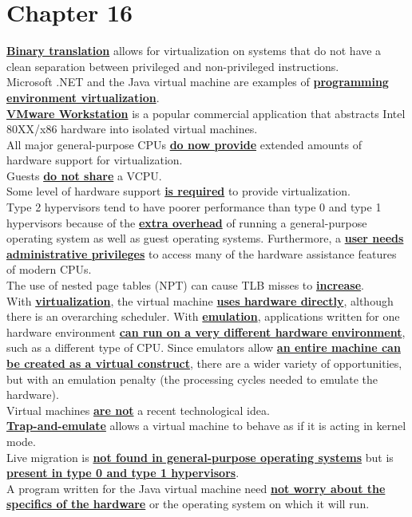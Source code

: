 \documentclass[10pt]{article}
\newcommand{\qw}[1]{\textbf{\ul{#1}}}
\begin{document}
\section*{\centering Chapter 16}
\qw{Binary translation} allows for virtualization on systems that do not have a clean separation between privileged and non-privileged instructions.\\[2mm]
Microsoft .NET and the Java virtual machine are examples of \qw{programming environment virtualization}.\\[2mm]
\qw{VMware Workstation} is a popular commercial application that abstracts Intel 80XX/x86 hardware into isolated virtual machines.\\[2mm]
All major general-purpose CPUs \qw{do now provide} extended amounts of hardware support for virtualization.\\[2mm]
Guests \qw{do not share} a VCPU.\\[2mm]
Some level of hardware support \qw{is required} to provide virtualization.\\[2mm]
Type 2 hypervisors tend to have poorer performance than type 0 and type 1 hypervisors because of the \qw{extra overhead} of running a general-purpose operating system as well as guest operating systems. Furthermore, a \qw{user needs administrative privileges} to access many of the hardware assistance features of modern CPUs.\\[2mm]
The use of nested page tables (NPT) can cause TLB misses to \qw{increase}.\\[2mm]
With \qw{virtualization}, the virtual machine \qw{uses hardware directly}, although there is an overarching scheduler. With \qw{emulation}, applications written for one hardware environment \qw{can run on a very different hardware environment}, such as a different type of CPU. Since emulators allow \qw{an entire machine can be created as a virtual construct}, there are a wider variety of opportunities, but with an emulation penalty (the processing cycles needed to emulate the hardware).\\[2mm]
Virtual machines \qw{are not} a recent technological idea.\\[2mm]
\qw{Trap-and-emulate} allows a virtual machine to behave as if it is acting in kernel mode.\\[2mm]
Live migration is \qw{not found in general-purpose operating systems} but is \qw{present in type 0 and type 1 hypervisors}.\\[2mm]
A program written for the Java virtual machine need \qw{not worry about the specifics of the hardware} or the operating system on which it will run.\\[2mm]
\end{document}
